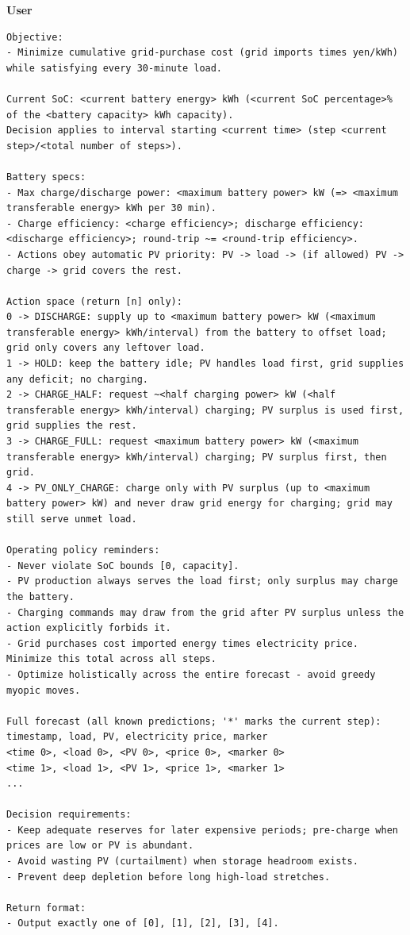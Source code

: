 \documentclass[11pt]{article}
\newcommand{\promptrole}[1]{\par\Needspace*{6\baselineskip}\noindent\textbf{#1}\par\nopagebreak}
\begin{document}
\promptrole{User}
\begin{lstlisting}[style=promptblock]
Objective:
- Minimize cumulative grid-purchase cost (grid imports times yen/kWh) while satisfying every 30-minute load.

Current SoC: <current battery energy> kWh (<current SoC percentage>% of the <battery capacity> kWh capacity).
Decision applies to interval starting <current time> (step <current step>/<total number of steps>).

Battery specs:
- Max charge/discharge power: <maximum battery power> kW (=> <maximum transferable energy> kWh per 30 min).
- Charge efficiency: <charge efficiency>; discharge efficiency: <discharge efficiency>; round-trip ~= <round-trip efficiency>.
- Actions obey automatic PV priority: PV -> load -> (if allowed) PV -> charge -> grid covers the rest.

Action space (return [n] only):
0 -> DISCHARGE: supply up to <maximum battery power> kW (<maximum transferable energy> kWh/interval) from the battery to offset load; grid only covers any leftover load.
1 -> HOLD: keep the battery idle; PV handles load first, grid supplies any deficit; no charging.
2 -> CHARGE_HALF: request ~<half charging power> kW (<half transferable energy> kWh/interval) charging; PV surplus is used first, grid supplies the rest.
3 -> CHARGE_FULL: request <maximum battery power> kW (<maximum transferable energy> kWh/interval) charging; PV surplus first, then grid.
4 -> PV_ONLY_CHARGE: charge only with PV surplus (up to <maximum battery power> kW) and never draw grid energy for charging; grid may still serve unmet load.

Operating policy reminders:
- Never violate SoC bounds [0, capacity].
- PV production always serves the load first; only surplus may charge the battery.
- Charging commands may draw from the grid after PV surplus unless the action explicitly forbids it.
- Grid purchases cost imported energy times electricity price. Minimize this total across all steps.
- Optimize holistically across the entire forecast - avoid greedy myopic moves.

Full forecast (all known predictions; '*' marks the current step):
timestamp, load, PV, electricity price, marker
<time 0>, <load 0>, <PV 0>, <price 0>, <marker 0>
<time 1>, <load 1>, <PV 1>, <price 1>, <marker 1>
...

Decision requirements:
- Keep adequate reserves for later expensive periods; pre-charge when prices are low or PV is abundant.
- Avoid wasting PV (curtailment) when storage headroom exists.
- Prevent deep depletion before long high-load stretches.

Return format:
- Output exactly one of [0], [1], [2], [3], [4].
\end{lstlisting}
\end{document}
